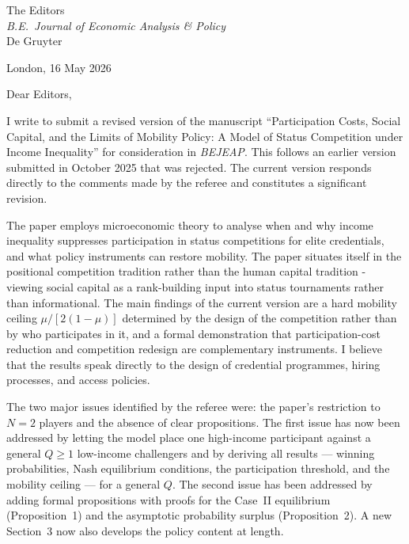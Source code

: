 \documentclass[11pt]{article}
\begin{document}
\noindent
The Editors\\
\textit{B.E.\ Journal of Economic Analysis \& Policy}\\
De Gruyter

\bigskip
\noindent
London, 16 May 2026

\bigskip
\noindent
Dear Editors,

\medskip

I write to submit a revised version of the manuscript
``Participation Costs, Social Capital, and the Limits of Mobility
Policy: A Model of Status Competition under Income Inequality''
for consideration in \textit{BEJEAP}. This follows an earlier version 
submitted in October 2025 that was rejected. The current version
responds directly to the comments made by the referee and constitutes a significant revision.

The paper employs microeconomic theory to analyse when and why
income inequality suppresses participation in status competitions
for elite credentials, and what policy instruments can restore
mobility. The paper situates itself in the positional competition tradition
rather than the human capital tradition - viewing social capital as a
rank-building input into status tournaments rather than
informational. The main findings of the current version are a hard mobility ceiling
$\mu/[2(1-\mu)]$ determined by the design of the
competition rather than by who participates in it, and a formal
demonstration that participation-cost reduction and competition
redesign are complementary instruments. I believe that the results speak directly to the design of
credential programmes, hiring processes, and access policies.

The two major issues identified by the referee were: the paper's restriction to
$N=2$ players and the absence of clear propositions. The first issue has now been addressed by letting the model place one high-income participant against a general $Q \geq 1$ low-income challengers and by deriving all results --- winning
probabilities, Nash equilibrium conditions, the participation
threshold, and the mobility ceiling --- for a general $Q$. The second issue has been addressed by adding formal propositions with proofs for the Case~II equilibrium (Proposition~1) and the asymptotic probability surplus (Proposition~2). A new Section~3 now also develops the policy content at length.
\end{document}
